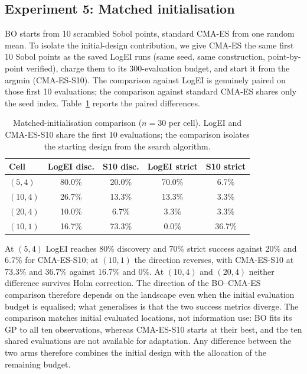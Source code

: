 \documentclass[11pt,a4paper]{article}
\begin{document}
\subsection{Experiment 5: Matched initialisation}\label{sec:matched}
BO starts from 10 scrambled Sobol points, standard CMA-ES from one random mean. To isolate the initial-design contribution, we give CMA-ES the same first 10 Sobol points as the saved LogEI runs (same seed, same construction, point-by-point verified), charge them to its 300-evaluation budget, and start it from the argmin (CMA-ES-S10). The comparison against LogEI is genuinely paired on those first 10 evaluations; the comparison against standard CMA-ES shares only the seed index. Table~\ref{tab:matched} reports the paired differences.

\begin{table}[!htbp]
\centering\small
\begin{tabular}{@{}lcccc@{}}
\toprule
Cell & LogEI disc. & S10 disc. & LogEI strict & S10 strict\\
\midrule
$(5,4)$ & 80.0\% & 20.0\% & 70.0\% & 6.7\%\\
$(10,4)$ & 26.7\% & 13.3\% & 13.3\% & 3.3\%\\
$(20,4)$ & 10.0\% & 6.7\% & 3.3\% & 3.3\%\\
$(10,1)$ & 16.7\% & 73.3\% & 0.0\% & 36.7\%\\
\bottomrule
\end{tabular}
\caption{Matched-initialisation comparison ($n=30$ per cell). LogEI and CMA-ES-S10 share the first 10 evaluations; the comparison isolates the starting design from the search algorithm.}
\label{tab:matched}
\end{table}

At $(5,4)$ LogEI reaches 80\% discovery and 70\% strict success against 20\% and 6.7\% for CMA-ES-S10; at $(10,1)$ the direction reverses, with CMA-ES-S10 at 73.3\% and 36.7\% against 16.7\% and 0\%. At $(10,4)$ and $(20,4)$ neither difference survives Holm correction. The direction of the BO--CMA-ES comparison therefore depends on the landscape even when the initial evaluation budget is equalised; what generalises is that the two success metrics diverge. The comparison matches initial evaluated locations, not information use: BO fits its GP to all ten observations, whereas CMA-ES-S10 starts at their best, and the ten shared evaluations are not available for adaptation. Any difference between the two arms therefore combines the initial design with the allocation of the remaining budget.
\end{document}
